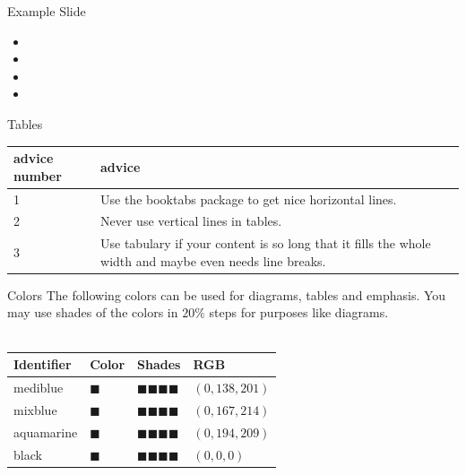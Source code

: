 \documentclass[aspectratio=1610,12pt]{beamer}
\newcommand{\imageslide}[4][]
{
\newgeometry{margin=0cm,top=1em}
\begin{frame}[plain]{~~~~#2}
\vspace{0.2em}
\centering\texttt{[image: \#3]}
\\#1
\note{#4}
\end{frame}
\restoregeometry
}
\begin{document}

\begin{frame}{Example Slide}
\begin{itemize}
\item 
\item 
\item 
\item 
\end{itemize}
\end{frame}

\begin{frame}{Tables}
\begin{tabulary}{\textwidth}{lL}
\toprule
advice number    &advice\\
   &Use the booktabs package to get nice horizontal lines.\\
2   &Never use vertical lines in tables.\\
3   &Use tabulary if your content is so long that it fills the whole width and maybe even needs line breaks.\\
\bottomrule
\end{tabulary}
\end{frame}

\begin{frame}{Colors}
The following colors can be used for diagrams, tables and emphasis.
You may use shades of the colors in $20 \%$ steps for purposes like diagrams.\\
~\\
\centering
\scalebox{1.5}
{
\begin{tabulary}{\textwidth}{llll}
\toprule
Identifier	&Color					&Shades																		&RGB\\
\midrule
mediblue   	&\Huge\color{mediblue}$\blacksquare$	&\Huge\color{mediblue!80}$\blacksquare$\color{mediblue!60}$\blacksquare$\color{mediblue!40}$\blacksquare$\color{mediblue!20}$\blacksquare$	&$(0,138,201)$\\
mixblue   	&\Huge\color{mixblue}$\blacksquare$	&\Huge\color{mixblue!80}$\blacksquare$\color{mixblue!60}$\blacksquare$\color{mixblue!40}$\blacksquare$\color{mixblue!20}$\blacksquare$	&$(0,167,214)$\\
aquamarine	&\Huge\color{aquamarine}$\blacksquare$	&\Huge\color{aquamarine!80}$\blacksquare$\color{aquamarine!60}$\blacksquare$\color{aquamarine!40}$\blacksquare$\color{aquamarine!20}$\blacksquare$	&$(0,194,209)$\\
black		&\Huge\color{black}$\blacksquare$	&\Huge\color{black!80}$\blacksquare$\color{black!60}$\blacksquare$\color{black!40}$\blacksquare$\color{black!20}$\blacksquare$	&$(0,0,0)$\\
\bottomrule
\end{tabulary}
}
\end{frame}
\end{document}
